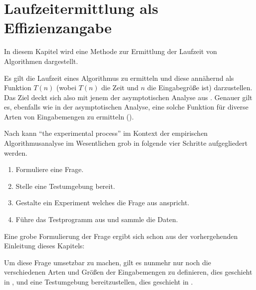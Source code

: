 \chapter{Laufzeitermittlung als Effizienzangabe}

In diesem Kapitel wird eine Methode zur Ermittlung der Laufzeit von Algorithmen dargestellt.

Es gilt die Laufzeit eines Algorithmus zu ermitteln und diese annähernd als Funktion $T(n)$ (wobei $T(n)$ die Zeit und $n$ die Eingabegröße ist) darzustellen. Das Ziel deckt sich also mit jenem der asymptotischen Analyse aus . Genauer gilt es, ebenfalls wie in der asymptotischen Analyse, eine solche Funktion für diverse Arten von Eingabemengen zu ermitteln (\cite[27]{mcg2012}).

Nach \cite[10]{mcg2012} kann \enquote{the experimental process} im Kontext der empirischen Algorithmusanalyse im Wesentlichen grob in folgende vier Schritte aufgegliedert werden.

\begin{enumerate}
     \item Formuliere eine Frage.\label{itm:experiment-formulate-question}
     \item Stelle eine Testumgebung bereit.\label{itm:experiment-environment}
     \item Gestalte ein Experiment welches die Frage aus  anspricht.
     \item Führe das Testprogramm aus und sammle die Daten.
 \end{enumerate}

Eine grobe Formulierung der Frage ergibt sich schon aus der vorhergehenden Einleitung dieses Kapitels:


Um diese Frage umsetzbar zu machen, gilt es nunmehr nur noch die verschiedenen Arten und Größen der Eingabemengen zu definieren, dies geschieht in , und eine Testumgebung bereitzustellen, dies geschieht in .


